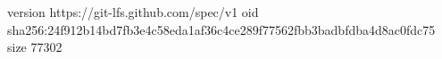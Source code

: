 version https://git-lfs.github.com/spec/v1
oid sha256:24f912b14bd7fb3e4c58eda1af36c4ce289f77562fbb3badbfdba4d8ac0fdc75
size 77302

